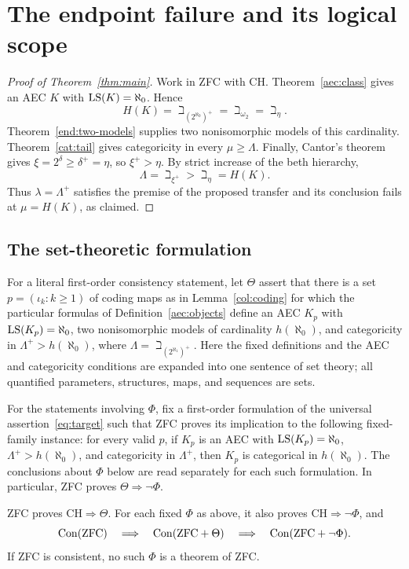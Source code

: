 \section{The endpoint failure and its logical scope}\label{sec:conclusion}

\begin{proof}[Proof of Theorem~\ref{thm:main}]
Work in ZFC with CH. Theorem~\ref{aec:class} gives an AEC \(K\) with
\(\operatorname{LS}(K)=\aleph_0\). Hence
\[
 H(K)=\beth_{(2^{\aleph_0})^+}=\beth_{\omega_2}
      =\beth_\eta.
\]
Theorem~\ref{end:two-models} supplies two nonisomorphic models of this
cardinality. Theorem~\ref{cat:tail} gives categoricity in every
\(\mu\ge\Lambda\). Finally, Cantor's theorem gives
\(\xi=2^\delta\ge\delta^+=\eta\), so \(\xi^+>\eta\). By strict
increase of the beth hierarchy,
\[
 \Lambda=\beth_{\xi^+}>\beth_\eta=H(K).
\]
Thus \(\lambda=\Lambda^+\) satisfies the premise of the proposed
transfer and its conclusion fails at \(\mu=H(K)\), as claimed.
\end{proof}

\subsection{The set-theoretic formulation}

For a literal first-order consistency statement, let \(\Theta\) assert
that there is a set
\(p=(\iota_k:k\ge1)\) of coding maps as in Lemma~\ref{col:coding}
for which the particular formulas of Definition~\ref{aec:objects}
define an AEC \(K_p\) with \(\operatorname{LS}(K_p)=\aleph_0\), two
nonisomorphic models of cardinality \(h(\aleph_0)\), and
categoricity in \(\Lambda^+>h(\aleph_0)\), where
\(\Lambda=\beth_{(2^{\aleph_1})^+}\).
Here the fixed definitions and the AEC and categoricity conditions
are expanded into one sentence of set theory; all quantified
parameters, structures, maps, and sequences are sets.

For the statements involving \(\Phi\), fix a first-order formulation
of the universal assertion~\eqref{eq:target} such that ZFC proves
its implication to the following fixed-family instance: for every
valid \(p\), if \(K_p\) is an AEC with \(\operatorname{LS}(K_p)=\aleph_0\),
\(\Lambda^+>h(\aleph_0)\), and categoricity in \(\Lambda^+\),
then \(K_p\) is categorical in \(h(\aleph_0)\).
The conclusions about \(\Phi\) below are read separately for each
such formulation. In particular, ZFC proves
\(\Theta\Rightarrow\neg\Phi\).

\begin{corollary}\label{cor:consistency}
ZFC proves \(\mathrm{CH}\Rightarrow\Theta\).
For each fixed \(\Phi\) as above, it also proves
\(\mathrm{CH}\Rightarrow\neg\Phi\), and
\[
 \operatorname{Con}(\mathrm{ZFC})
 \quad\Longrightarrow\quad
 \operatorname{Con}(\mathrm{ZFC}+\Theta)
 \quad\Longrightarrow\quad
 \operatorname{Con}(\mathrm{ZFC}+\neg\Phi).
\]
If ZFC is consistent, no such \(\Phi\) is a theorem of ZFC.
\end{corollary}

